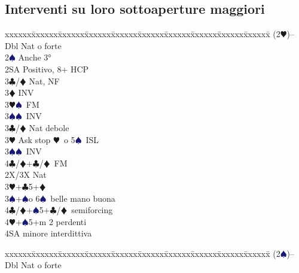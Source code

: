 \documentclass[a4paper,italian]{article}
\newcommand{\BC}{\textcolor{OliveGreen}{$\clubsuit$}}
\newcommand{\BD}{\textcolor{RedOrange}{$\vardiamondsuit$}}
\newcommand{\BH}{\textcolor{Red2}{$\varheartsuit${}}}
\newcommand{\BS}{\textcolor{MidnightBlue}{$\spadesuit${}}}
\newenvironment{bidtable}
{\begin{tabbing}

    xxxxxx\=xxxxxx\=xxxxxx\=xxxxxx\=xxxxxx\=xxxxxx\=xxxxxx\=xxxxxx\=xxxxxx\=xxxxxx\=\kill}
{\end{tabbing} }%
\begin{document}
\begin{multicols}{2}
                                        \subsection{Interventi su loro sottoaperture maggiori}
                                        \begin{bidtable}
                                            (2\BH)--\\
                                            Dbl \> Nat o forte\+\\
                                            2\BS\> Anche 3°\\
                                            2SA\> Positivo, 8+ HCP\+\\
                                            3\BC/\BD \> Nat, NF\+\\
                                            3\BD\> INV\\
                                            3\BH{}\BS\ FM\\
                                            3\BS{}\BS\ INV\-\-\\
                                            3\BC/\BD\> Nat debole\\
                                            3\BH\> Ask stop \BH\ o 5\BS\ ISL\\
                                            3\BS{}\BS\ INV\\
                                            4\BC/\BD{}+\BC/\BD\ FM\-\\
                                            2X/3X\> Nat\\
                                            3\BH{}+\BC5+\BD\\
                                            3\BS{}+\BS o 6\BS\ belle mano buona\\
                                            4\BC/\BD{}+\BS5+\BC/\BD\ semiforcing\\
                                            4\BH{}+\BS5+m 2 perdenti\\
                                            4SA minore interdittiva
                                        \end{bidtable}
                                        \begin{bidtable}
                                            (2\BS)--\\
                                            Dbl \> Nat o forte\+\\

\end{bidtable}
\end{multicols}
\end{document}

